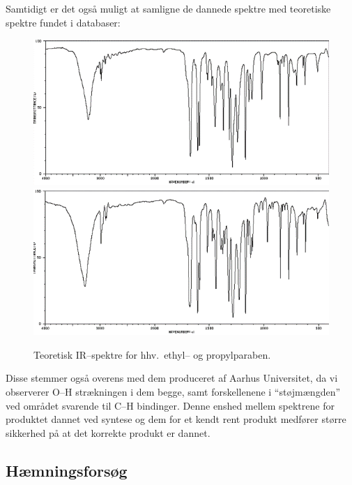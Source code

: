     Samtidigt er det også muligt at samligne de dannede spektre med teoretiske spektre fundet i databaser:
    \begin{figure}[H]
        \includegraphics[width=.48\linewidth]{billeder/irethyl}
        \includegraphics[width=.48\linewidth]{billeder/irpropyl}
        \caption{Teoretisk IR--spektre for hhv.\ ethyl-- og propylparaben.}
    \end{figure}
    Disse stemmer også overens med dem produceret af Aarhus Universitet, da vi observerer O--H strækningen i dem begge, samt forskellenene i ``støjmængden'' ved området svarende til C--H bindinger. Denne enshed mellem spektrene for produktet dannet ved syntese og dem for et kendt rent produkt medfører større sikkerhed på at det korrekte produkt er dannet.

    \subsection{Hæmningsforsøg}

